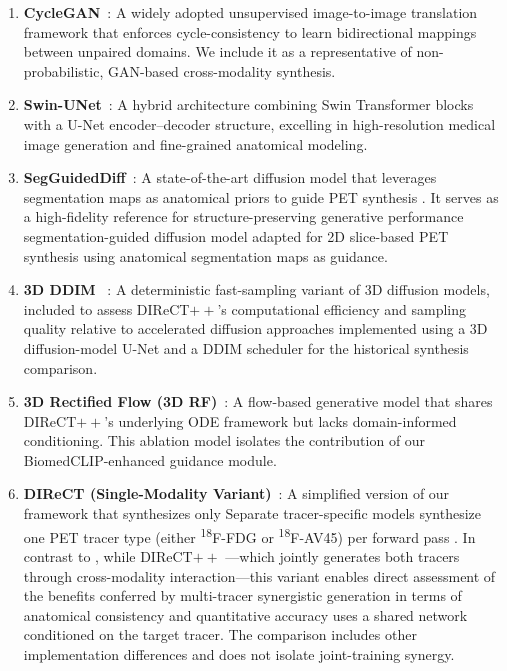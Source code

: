 \documentclass{article}
\providecommand{\DIFaddtex}[1]{{\protect\color{blue} \sf #1}} %
\providecommand{\DIFdeltex}[1]{{\protect\color{red} \scriptsize #1}} %
\providecommand{\DIFaddbegin}{} %
\providecommand{\DIFaddend}{} %
\providecommand{\DIFdelbegin}{} %
\providecommand{\DIFdelend}{} %
\providecommand{\DIFadd}[1]{\texorpdfstring{\DIFaddtex{#1}}{#1}} %
\providecommand{\DIFdel}[1]{\texorpdfstring{\DIFdeltex{#1}}{}} %
\newcommand{\DIFscaledelfig}{0.5}
\newlength{\DIFdelgraphicswidth} %
\newlength{\DIFdelgraphicsheight} %
\newcommand{\DIFaddincludegraphics}[2][]{{\color{blue}\fbox{\DIFOincludegraphics[#1]{#2}}}} %
\newcommand{\DIFdelincludegraphics}[2][]{%
\sbox{\DIFdelgraphicsbox}{\DIFOincludegraphics[#1]{#2}}%
\settoboxwidth{\DIFdelgraphicswidth}{\DIFdelgraphicsbox} %
\settoboxtotalheight{\DIFdelgraphicsheight}{\DIFdelgraphicsbox} %
\scalebox{\DIFscaledelfig}{%
\parbox[b]{\DIFdelgraphicswidth}{\usebox{\DIFdelgraphicsbox}\\[-\baselineskip] \rule{\DIFdelgraphicswidth}{0em}}\llap{\resizebox{\DIFdelgraphicswidth}{\DIFdelgraphicsheight}{%
\setlength{\unitlength}{\DIFdelgraphicswidth}%
\begin{picture}(1,1)%
\thicklines\linethickness{2pt} %
{\color[rgb]{1,0,0}\put(0,0){\framebox(1,1){}}}%
{\color[rgb]{1,0,0}\put(0,0){\line( 1,1){1}}}%
{\color[rgb]{1,0,0}\put(0,1){\line(1,-1){1}}}%
\end{picture}%
}\hspace*{3pt}}} %
} %
\DeclareRobustCommand{\DIFaddbegin}{\DIFOaddbegin \let\includegraphics\DIFaddincludegraphics} %
\DeclareRobustCommand{\DIFaddend}{\DIFOaddend \let\includegraphics\DIFOincludegraphics} %
\DeclareRobustCommand{\DIFdelbegin}{\DIFOdelbegin \let\includegraphics\DIFdelincludegraphics} %
\DeclareRobustCommand{\DIFdelend}{\DIFOaddend \let\includegraphics\DIFOincludegraphics} %
\begin{document}
\begin{enumerate}
    \item \textbf{CycleGAN}~\cite{zhu2017unpaired}: A widely adopted unsupervised image-to-image translation framework that enforces cycle-consistency to learn bidirectional mappings between unpaired domains. We include it as a representative of non-probabilistic, GAN-based cross-modality synthesis.

    \item \textbf{Swin-UNet}~\cite{Cao2021swin}: A hybrid architecture combining Swin Transformer blocks with a U-Net encoder–decoder structure, excelling in high-resolution medical image generation and fine-grained anatomical modeling.

    \item \textbf{SegGuidedDiff}~\cite{konz2024anatomically}: A \DIFdelbegin \DIFdel{state-of-the-art diffusion model that leverages segmentation maps as anatomical priors to guide PET synthesis . It serves as a high-fidelity reference for structure-preserving generative performance}\DIFdelend \DIFaddbegin \DIFadd{segmentation-guided diffusion model adapted for 2D slice-based PET synthesis using anatomical segmentation maps as guidance}\DIFaddend .

    \item \textbf{3D DDIM}~\DIFdelbegin \DIFdel{\cite{Graf2023}}\DIFdelend \DIFaddbegin \DIFadd{\cite{song2021ddim,pinaya2023generative}}\DIFaddend : A deterministic fast-sampling variant of 3D diffusion models, \DIFdelbegin \DIFdel{included to assess DIReCT$++$’s computational efficiency and sampling quality relative to accelerated diffusion approaches}\DIFdelend \DIFaddbegin \DIFadd{implemented using a 3D diffusion-model U-Net and a DDIM scheduler for the historical synthesis comparison}\DIFaddend .

    \item \textbf{3D Rectified Flow (3D RF)}~\cite{Xing2022}: A flow-based generative model that shares DIReCT$++$’s underlying ODE framework but lacks domain-informed conditioning.
\DIFdelbegin \DIFdel{This ablation model isolates the contribution of our BiomedCLIP-enhanced guidance module.
}\DIFdelend 

    \item \textbf{DIReCT (Single-Modality Variant)}~\cite{liu2025direct}: \DIFdelbegin \DIFdel{A simplified version of our framework that synthesizes only }\DIFdelend \DIFaddbegin \DIFadd{Separate tracer-specific models synthesize }\DIFaddend one PET tracer \DIFdelbegin \DIFdel{type (either \textsuperscript{18}F-FDG or \textsuperscript{18}F-AV45) }\DIFdelend per forward pass\DIFdelbegin \DIFdel{. In contrast to }\DIFdelend \DIFaddbegin \DIFadd{, while }\DIFaddend DIReCT$++$ \DIFdelbegin \DIFdel{—which jointly generates both tracers through cross-modality interaction—this variant enables direct assessment of the benefits conferred by multi-tracer synergistic generation in terms of anatomical consistency and quantitative accuracy}\DIFdelend \DIFaddbegin \DIFadd{uses a shared network conditioned on the target tracer. The comparison includes other implementation differences and does not isolate joint-training synergy}\DIFaddend .
\end{enumerate}
\end{document}
